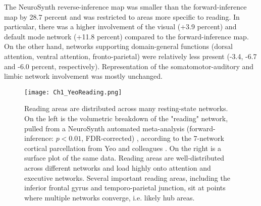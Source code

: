 The NeuroSynth reverse-inference map was smaller than the forward-inference map by 28.7 percent and was restricted to areas more specific to reading. In particular, there was a higher involvement of the visual (+3.9 percent) and default mode network (+11.8 percent) compared to the forward-inference map. On the other hand, networks supporting domain-general functions (dorsal attention, ventral attention, fronto-parietal) were relatively less present (-3.4, -6.7 and -6.0 percent, respectively). Representation of the somatomotor-auditory and limbic network involvement was mostly unchanged.

\begin{figure}
\centering
\texttt{[image: Ch1\_YeoReading.png]}
    \caption[Reading areas are distributed across many resting-state networks.]{Reading areas are distributed across many resting-state networks. On the left is the volumetric breakdown of the "reading" network, pulled from a NeuroSynth automated meta-analysis (forward-inference: $p < 0.01$, FDR-corrected) \cite{Yarkoni2011}, according to the 7-network cortical parcellation from Yeo and colleagues \cite{Yeo2011}. On the right is a surface plot of the same data. Reading areas are well-distributed across different networks and load highly onto attention and executive networks. Several important reading areas, including the inferior frontal gyrus and temporo-parietal junction, sit at points where multiple networks converge, i.e. likely hub areas.}
    \label{fig:texlogo}
\end{figure}


